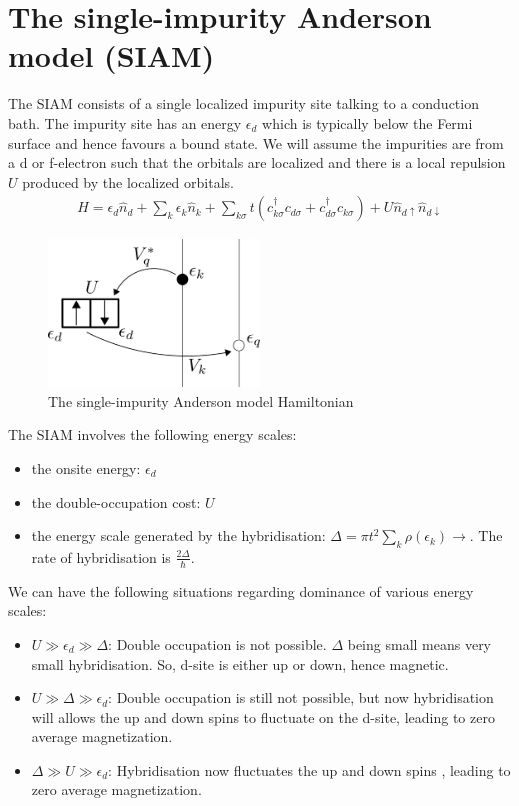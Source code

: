 \documentclass[twoside]{report}
\numberwithin{equation}{section}
\begin{document}
\section{The single-impurity Anderson model (SIAM)}
The SIAM consists of a single localized impurity site talking to a conduction bath. The impurity site has an energy \(\epsilon_d\) which is typically below the Fermi surface and hence favours a bound state. We will assume the impurities are from a d or f-electron such that the orbitals are localized and there is a local repulsion \(U\) produced by the localized orbitals.
\begin{equation}\begin{aligned}
	\label{model}
	H = \epsilon_d \hat n_d + \sum_{k} \epsilon_k \hat n_k + \sum_{k\sigma}t\left(c^\dagger_{k\sigma}c_{d\sigma}+c^\dagger_{d\sigma}c_{k\sigma}\right) + U\hat n_{d\uparrow}\hat n_{d\downarrow}
\end{aligned}\end{equation}
\begin{figure}[htpb]
	\centering
	\includegraphics[width=0.5\textwidth]{../figures/model_scheme.png}
	\caption{The single-impurity Anderson model Hamiltonian}
\end{figure}
The SIAM involves the following energy scales:
\begin{itemize}
	\item the onsite energy: \(\epsilon_d\)
	\item the double-occupation cost: \(U\)
	\item the energy scale generated by the hybridisation: \(\Delta = \pi t^2\sum_k \rho(\epsilon_k) \rightarrow \). The rate of hybridisation is \(\frac{2\Delta}{\hbar}\).
\end{itemize}
We can have the following situations regarding dominance of various energy scales:
\begin{itemize}
	\item \(U \gg \epsilon_d \gg \Delta\): Double occupation is not possible.
		\(\Delta\) being small means very small hybridisation.
So, d-site is either up or down, hence magnetic.
    \item \(U \gg \Delta\gg \epsilon_d \): Double occupation is still not possible, but now hybridisation will allows the up and down spins to fluctuate on the d-site, leading to zero average magnetization.
    \item \(\Delta\gg U \gg \epsilon_d\): Hybridisation now fluctuates the up and down spins , leading to zero average magnetization.
\end{itemize}
\end{document}
